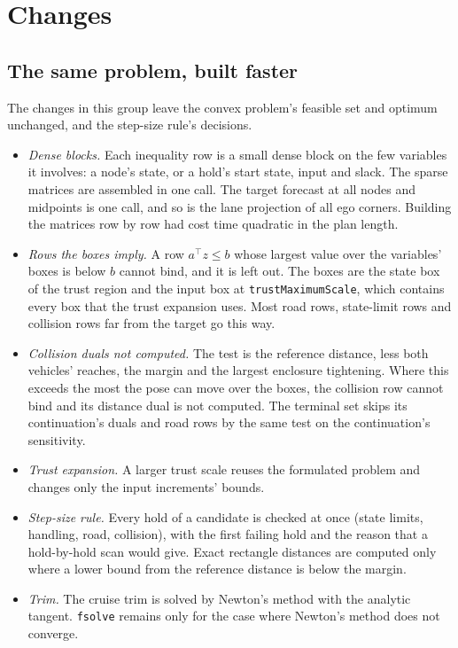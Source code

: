 \documentclass[11pt]{article}
\begin{document}
\section{Changes}
\subsection{The same problem, built faster}
The changes in this group leave the convex problem's feasible set and
optimum unchanged, and the step-size rule's decisions.
\begin{itemize}
\item \emph{Dense blocks.} Each inequality row is a small dense block on
  the few variables it involves: a node's state, or a hold's start state,
  input and slack. The sparse matrices are assembled in one call. The target
  forecast at all nodes and midpoints is one call, and so is the lane
  projection of all ego corners. Building the matrices row by row had cost
  time quadratic in the plan length.
\item \emph{Rows the boxes imply.} A row $a^\top z\le b$ whose largest
  value over the variables' boxes is below $b$ cannot bind, and it is left
  out. The boxes are the state box of the trust region and the input box at
  \texttt{trustMaximumScale}, which contains every box that the trust
  expansion uses. Most road rows, state-limit rows and collision rows far
  from the target go this way.
\item \emph{Collision duals not computed.} The test is the reference
  distance, less both vehicles' reaches, the margin and the largest
  enclosure tightening. Where this exceeds the most the pose can move over
  the boxes, the collision row cannot bind and its distance dual is not
  computed. The terminal set skips its continuation's duals and road rows
  by the same test on the continuation's sensitivity.
\item \emph{Trust expansion.} A larger trust scale reuses the formulated
  problem and changes only the input increments' bounds.
\item \emph{Step-size rule.} Every hold of a candidate is checked at once
  (state limits, handling, road, collision), with the first failing hold and
  the reason that a hold-by-hold scan would give. Exact rectangle distances
  are computed only where a lower bound from the reference distance is
  below the margin.
\item \emph{Trim.} The cruise trim is solved by Newton's method with the
  analytic tangent. \texttt{fsolve} remains only for the case where Newton's
  method does not converge.
\end{itemize}
\end{document}
